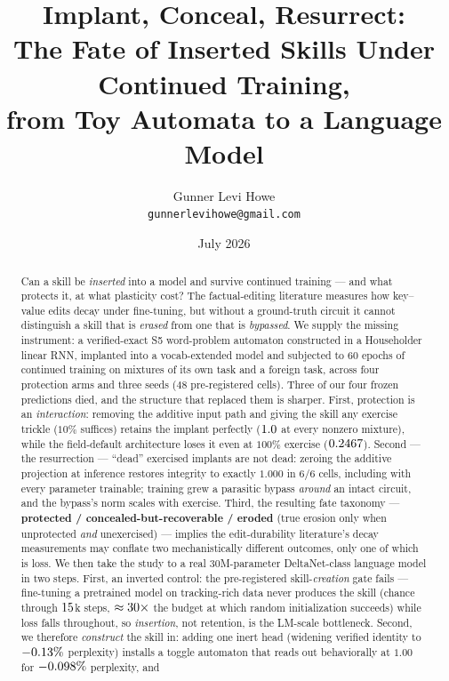 \documentclass[10pt]{article}
\title{Implant, Conceal, Resurrect:\\ The Fate of Inserted Skills Under Continued Training,\\
from Toy Automata to a Language Model}
\author{Gunner Levi Howe\\\texttt{gunnerlevihowe@gmail.com}}
\date{July 2026}
\begin{document}
\maketitle

\begin{abstract}
Can a skill be \emph{inserted} into a model and survive continued training --- and what protects
it, at what plasticity cost? The factual-editing literature measures how key--value edits decay
under fine-tuning, but without a ground-truth circuit it cannot distinguish a skill that is
\emph{erased} from one that is \emph{bypassed}. We supply the missing instrument: a verified-exact
S5 word-problem automaton constructed in a Householder linear RNN, implanted into a vocab-extended
model and subjected to $60$ epochs of continued training on mixtures of its own task and a foreign
task, across four protection arms and three seeds ($48$ pre-registered cells). Three of our four
frozen predictions died, and the structure that replaced them is sharper. First, protection is an
\emph{interaction}: removing the additive input path and giving the skill any exercise trickle
($10\%$ suffices) retains the implant perfectly ($1.0$ at every nonzero mixture),
while the field-default architecture loses it even at $100\%$ exercise ($0.2467$).
Second --- the resurrection --- ``dead'' exercised implants are not dead: zeroing the additive
projection at inference restores integrity to exactly $1.000$ in $6/6$ cells, including with every
parameter trainable; training grew a parasitic bypass \emph{around} an intact circuit, and the
bypass's norm scales with exercise. Third, the resulting fate taxonomy --- \textbf{protected /
concealed-but-recoverable / eroded} (true erosion only when unprotected \emph{and} unexercised)
--- implies the edit-durability literature's decay measurements may conflate two mechanistically
different outcomes, only one of which is loss. We then take the study to a real 30M-parameter
DeltaNet-class language model in two steps. First, an inverted control: the pre-registered
skill-\emph{creation} gate fails --- fine-tuning a pretrained model on tracking-rich data never
produces the skill (chance through $15$k steps, $\approx30\times$ the
budget at which random initialization succeeds) while loss falls throughout, so \emph{insertion},
not retention, is the LM-scale bottleneck. Second, we therefore \emph{construct} the skill in:
adding one inert head (widening verified identity to $-0.13\%$ perplexity) installs a
toggle automaton that reads out behaviorally at $1.00$ for $-0.098\%$ perplexity, and

\end{abstract}
\end{document}

